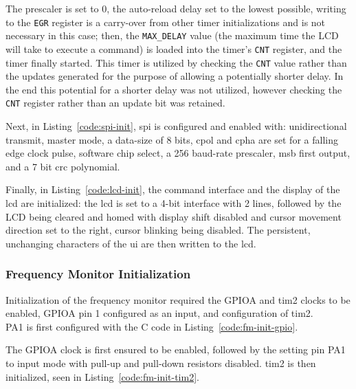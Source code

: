 The prescaler is set to 0, the auto-reload delay set to the lowest
possible, writing to the \lstinline{EGR} register is a carry-over from
other timer initializations and is not necessary in this case; then, the
\lstinline{MAX_DELAY} value (the maximum time the LCD will take to
execute a command) is loaded into the timer's \lstinline{CNT}
register, and the timer finally started. This timer is utilized
by checking the \lstinline{CNT} value rather than the updates generated
for the purpose of allowing a potentially shorter delay. In the end this
potential for a shorter delay was not utilized, however checking the
\lstinline{CNT} register rather than an update bit was retained.

Next, in Listing~\ref{code:spi-init}, \gls{spi} is configured and
enabled with: unidirectional transmit, master mode, a data-size of 8
bits, \gls{cpol} and \gls{cpha} are set for a falling edge clock pulse, software chip select, a 256 baud-rate
prescaler, \gls{msb} first output, and a 7 bit \gls{crc} polynomial.


Finally, in Listing~\ref{code:lcd-init}, the command interface and
the display of the \gls{lcd} are initialized: the \gls{lcd} is set to a
4-bit interface with 2 lines, followed by the LCD being cleared and
homed with display shift disabled and cursor movement direction set to
the right, cursor blinking being disabled. The persistent, unchanging
characters of the \gls{ui} are then written to the \gls{lcd}.


\subsubsection{Frequency Monitor Initialization}

Initialization of the frequency monitor required the GPIOA and
\gls{tim2} clocks to be enabled, GPIOA pin 1 configured as an input,
and configuration of \gls{tim2}. \\

PA1 is first configured with the C code in Listing~\ref{code:fm-init-gpio}.


The GPIOA clock is first ensured to be enabled, followed by the setting
pin PA1 to input mode with pull-up and pull-down resistors disabled.
\gls{tim2} is then initialized, seen in Listing~\ref{code:fm-init-tim2}.

